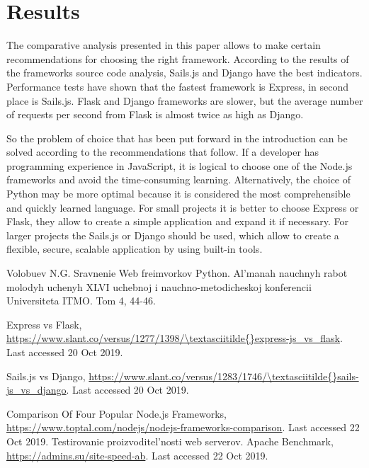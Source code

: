 \documentclass[runningheads]{llncs}
\begin{document}
\section{Results}
The comparative analysis presented in this paper allows to make certain recommendations for choosing the right framework. According to the results of the frameworks source code analysis, Sails.js and Django have the best indicators. Performance tests have shown that the fastest framework is Express, in second place is Sails.js. Flask and Django frameworks are slower, but the average number of requests per second from Flask is almost twice as high as Django. 

So the problem of choice that has been put forward in the introduction can be solved according to the recommendations that follow. If a developer has programming experience in JavaScript, it is logical to choose one of the Node.js frameworks and avoid the time-consuming learning. Alternatively, the choice of Python may be more optimal because it is considered the most comprehensible and quickly learned language. For small projects it is better to choose Express or Flask, they allow to create a simple application and expand it if necessary. For larger projects the Sails.js or Django should be used, which allow to create a flexible, secure, scalable application by using built-in tools.
%
%
% 
% 
%
\begin{thebibliography}{3}
Volobuev N.G. Sravnenie Web freimvorkov Python. Al'manah nauchnyh rabot molodyh uchenyh XLVI uchebnoj i nauchno-metodicheskoj konferencii Universiteta ITMO. Tom 4, 44-46.

Express vs Flask, \url{https://www.slant.co/versus/1277/1398/\textasciitilde{}express-js\_vs\_flask}. Last accessed 20 Oct 2019.

Sails.js vs Django, \url{https://www.slant.co/versus/1283/1746/\textasciitilde{}sails-js\_vs\_django}. Last accessed 20 Oct 2019.

Comparison Of Four Popular Node.js Frameworks, \url{https://www.toptal.com/nodejs/nodejs-frameworks-comparison}. Last accessed 22 Oct 2019.
Testirovanie proizvoditel'nosti web serverov. Apache Benchmark, \url{https://admins.su/site-speed-ab}. Last accessed 22 Oct 2019.

\end{thebibliography}
\end{document}
